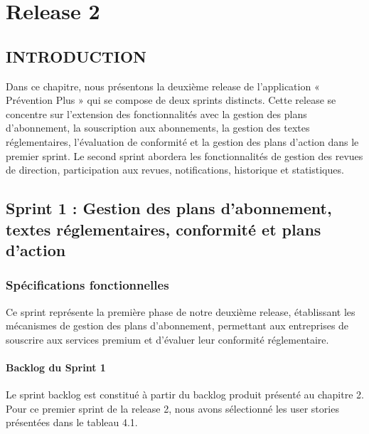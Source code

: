 \chapter{Release 2}

\begin{spacing}{1.2}
\minitoc
\thispagestyle{MyStyle}
\end{spacing}
\newpage

\section*{INTRODUCTION}
\noindent Dans ce chapitre, nous présentons la deuxième release de l'application « Prévention Plus » qui se compose de deux sprints distincts. Cette release se concentre sur l'extension des fonctionnalités avec la gestion des plans d'abonnement, la souscription aux abonnements, la gestion des textes réglementaires, l'évaluation de conformité et la gestion des plans d'action dans le premier sprint. Le second sprint abordera les fonctionnalités de gestion des revues de direction, participation aux revues, notifications, historique et statistiques.

\section{Sprint 1 : Gestion des plans d'abonnement, textes réglementaires, conformité et plans d'action}

\subsection{Spécifications fonctionnelles}
\noindent Ce sprint représente la première phase de notre deuxième release, établissant les mécanismes de gestion des plans d'abonnement, permettant aux entreprises de souscrire aux services premium et d'évaluer leur conformité réglementaire.

\subsubsection{Backlog du Sprint 1}
\noindent Le sprint backlog est constitué à partir du backlog produit présenté au chapitre 2. Pour ce premier sprint de la release 2, nous avons sélectionné les user stories présentées dans le tableau 4.1.


